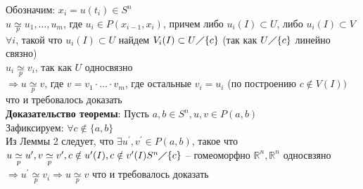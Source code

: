 	Обозначим: $x_i = u(t_i) \in S^n$\\
	$u \underset{p}{\simeq} u_1, \ldots ,u_m$, где $u_i \in P(x_{i-1}, x_i)$, причем либо $u_i (I) \subset U$, либо $u_i (I) \subset V$\\
	$\forall i$, такой что $u_i (I) \subset U$ найдем $V_i (I) \subset U \diagup \{ c\}$ (так как $U\diagup \{c\}$ линейно связно)\\
	$u_i \underset{p}{\simeq} v_i$, так как $U$ односвязно\\
	$\Rightarrow u \underset{p}{\simeq} v$, где $v = v_1 \cdot  \ldots  \cdot v_m$, где остальные $v_i = u_i$ (по построению $c\notin V(I))$ что и требовалось доказать\\
	\textbf{Доказательство теоремы}: Пусть $a, b \in S^n, u,v \in P(a,b)$\\
	Зафиксируем: $\forall c\notin \{a,b\}$\\
	Из Леммы 2 следует, что $\exists u^{\prime},v^{\prime} \in P(a,b)$, такое что $u \underset{p}{\simeq} u^{\prime}, v \underset{p}{\simeq} v^{\prime}, c\notin u^{\prime} (I), c\notin v^{\prime} (I)\\
	S^n \diagup \{c\}$ -- гомеоморфно $\mathbb{R}^n, \mathbb{R}^n$ односвзяно $\Rightarrow u^{\prime} \underset{p}{\simeq} v_i \Rightarrow u \underset{p}{\simeq} v$ что и требовалось доказать
	


\newpage
